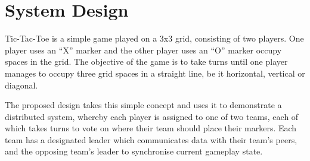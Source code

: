 \documentclass[conference]{IEEEtran}
\begin{document}
%


\section{System Design}
Tic-Tac-Toe is a simple game played on a 3x3 grid, consisting of two players. One player uses an “X” marker and the other player uses an “O” marker occupy spaces in the grid. The objective of the game is to take turns until one player manages to occupy three grid spaces in a straight line, be it horizontal, vertical or diagonal.

The proposed design takes this simple concept and uses it to demonstrate a distributed system, whereby each player is assigned to one of two teams, each of which takes turns to vote on where their team should place their markers. Each team has a designated leader which communicates data with their team's peers, and the opposing team's leader to synchronise current gameplay state.
\end{document}
